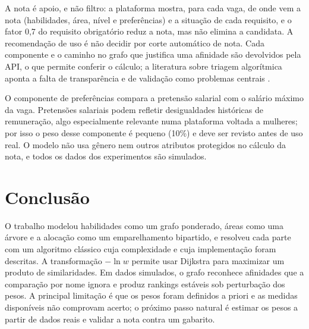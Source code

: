 \documentclass[12pt]{article}
\begin{document}
A nota é apoio, e não filtro: a plataforma mostra, para cada vaga, de onde vem a nota (habilidades, área, nível e preferências) e a situação de cada requisito, e o fator 0,7 do requisito obrigatório reduz a nota, mas não elimina a candidata. A recomendação de uso é não decidir por corte automático de nota. Cada componente e o caminho no grafo que justifica uma afinidade são devolvidos pela API, o que permite conferir o cálculo; a literatura sobre triagem algorítmica aponta a falta de transparência e de validação como problemas centrais \cite{raghavan2019}.

O componente de preferências compara a pretensão salarial com o salário máximo da vaga. Pretensões salariais podem refletir desigualdades históricas de remuneração, algo especialmente relevante numa plataforma voltada a mulheres; por isso o peso desse componente é pequeno (10\%) e deve ser revisto antes de uso real. O modelo não usa gênero nem outros atributos protegidos no cálculo da nota, e todos os dados dos experimentos são simulados.

\section{Conclusão}
\label{sec:conc}

O trabalho modelou habilidades como um grafo ponderado, áreas como uma árvore e a alocação como um emparelhamento bipartido, e resolveu cada parte com um algoritmo clássico cuja complexidade e cuja implementação foram descritas. A transformação $-\ln w$ permite usar Dijkstra para maximizar um produto de similaridades. Em dados simulados, o grafo reconhece afinidades que a comparação por nome ignora e produz rankings estáveis sob perturbação dos pesos. A principal limitação é que os pesos foram definidos a priori e as medidas disponíveis não comprovam acerto; o próximo passo natural é estimar os pesos a partir de dados reais e validar a nota contra um gabarito.



\end{document}
